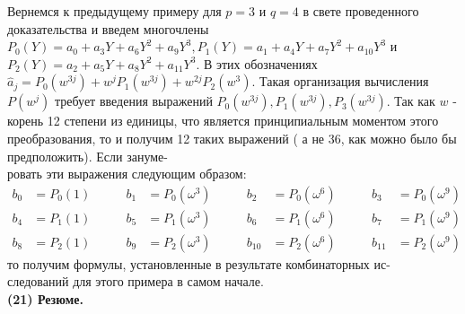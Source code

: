 \documentclass{mai_book}
\begin{document}
	Вернемся к предыдущему примеру для $p=3$ и $q=4$ в свете проведенного доказательства и введем многочлены $P_0(Y)=a_0+a_3Y+a_6Y^2+a_9Y^3, P_1(Y)=a_1+a_4Y+a_7Y^2+a_{10}Y^3$ и $P_2(Y)=a_2+a_5Y+a_8Y^2+a_{11}Y^3$. В этих обозначениях $\hat a_j = P_0(w^{3j})+w^jP_1(w^{3j})+w^{2j}P_2(w^3)$. Такая организация вычисления $P(w^j)$ требует введения выражений $P_0(w^{3j}), P_1(w^{3j}),P_3(w^{3j})$. Так как $w$ - корень 12 степени из единицы, что является принципиальным моментом этого преобразования, то и получим 12 таких
	\newpage 
\noindent выражений ( а не 36, как можно было бы предположить). Если зануме-\\ровать эти выражения следующим образом: \\
\begin{align*}
b_0&=P_0(1)  &\qquad b_1&=P_0(\omega^3) &\qquad b_2&=P_0(\omega^6) &\qquad b_3&=P_0(\omega^9)\\
b_4&=P_1(1) &\qquad b_5&=P_1(\omega^3) &\qquad b_6&=P_1(\omega^6) &\qquad b_7&=P_1(\omega^9) \\
b_8&=P_2(1) &\qquad b_9&=P_2(\omega^3) &\qquad {b_10}&=P_2(\omega^6) &\qquad {b_11}&=P_2(\omega^9)
\end{align*}
\smallskip
то получим формулы, установленные в результате комбинаторных ис-\\ следований для этого примера в самом начале.\\

\textbf{(21) Резюме.}
\end{document}
